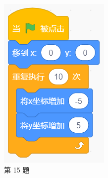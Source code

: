 \documentclass[10pt, a4paper]{article}
\begin{document}
\begin{enumerate}
\begin{figure}[htbp]
\begin{minipage}[t]{.13\textwidth}
                \includegraphics[width=\textwidth]{15.png}
                \caption*{第 15 题}
            \end{minipage}
        \end{figure}


\end{enumerate}
\end{document}

